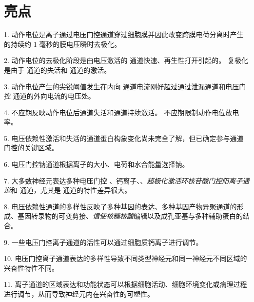 \section{亮点}

1. 动作电位是离子通过电压门控通道穿过细胞膜并因此改变跨膜电荷分离时产生的持续约 1 毫秒的膜电压瞬时去极化。


2. 动作电位的去极化阶段是由电压激活的  通道快速、再生性打开引起的。
复极化是由于  通道的失活和  通道的激活。


3. 动作电位产生的尖锐阈值发生在内向  通道电流刚好超过通过泄漏通道和电压门控  通道的外向电流的电压处。


4. 不应期反映动作电位后通道失活和通道持续激活。
不应期限制动作电位放电率。


5. 电压依赖性激活和失活的通道蛋白构象变化尚未完全了解，但已确定参与通道门控的关键区域。


6. 电压门控钠通道根据离子的大小、电荷和水合能量选择钠。


7. 大多数神经元表达多种电压门控 、钙离子、、\textit{超极化激活环核苷酸门控阳离子通道}和  通道，尤其是  通道的特性差异很大。


8. 电压依赖性通道的多样性反映了多种基因的表达、多种基因产物异聚通道的形成、基因转录物的可变剪接、\textit{信使核糖核酸}编辑以及成孔亚基与多种辅助蛋白的结合。


9. 一些电压门控离子通道的活性可以通过细胞质钙离子进行调节。


10. 电压门控离子通道表达的多样性导致不同类型神经元和同一神经元不同区域的兴奋性特性不同。


11. 离子通道的区域表达和功能状态可以根据细胞活动、细胞环境变化或病理过程进行调节，从而导致神经元内在兴奋性的可塑性。



